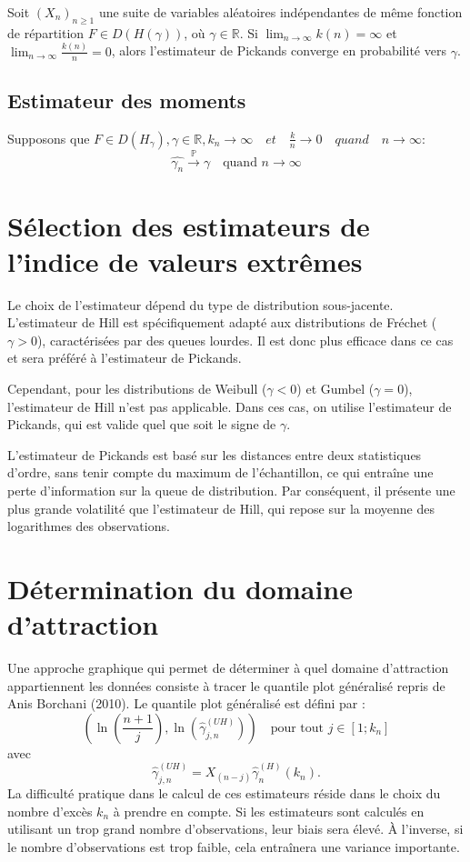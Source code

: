 \documentclass{article}
\begin{document}
Soit \((X_n)_{n \geq 1}\) une suite de variables aléatoires indépendantes de même fonction de répartition \(F \in D(H(\gamma))\), où \(\gamma \in \mathbb{R}\).
Si \(\lim_{n \to \infty} k(n) = \infty\) et \(\lim_{n \to \infty} \frac{k(n)}{n} = 0\), alors l'estimateur de Pickands converge en probabilité vers \(\gamma\).

\subsection{Estimateur des moments}
Supposons que \(F \in D(H_{\gamma}), \gamma \in \mathbb{R}, k_n \to \infty \quad et \quad \frac{k}{n} \to 0 \quad quand \quad n \to \infty\):
\[
\hat{\gamma_n} \xrightarrow{\mathbb{P}} \gamma \quad \text{quand } n \to \infty
\]


\section{Sélection des estimateurs de l'indice de valeurs extrêmes}

Le choix de l’estimateur dépend du type de distribution sous-jacente. L’estimateur de Hill est spécifiquement adapté aux distributions de Fréchet (\(\gamma > 0\)), caractérisées par des queues lourdes. Il est donc plus efficace dans ce cas et sera préféré à l’estimateur de Pickands.  

Cependant, pour les distributions de Weibull (\(\gamma < 0\)) et Gumbel (\(\gamma = 0\)), l’estimateur de Hill n’est pas applicable. Dans ces cas, on utilise l’estimateur de Pickands, qui est valide quel que soit le signe de \( \gamma \).  

L'estimateur de Pickands est basé sur les distances entre deux statistiques d'ordre, sans tenir compte du maximum de l’échantillon, ce qui entraîne une perte d'information sur la queue de distribution. Par conséquent, il présente une plus grande volatilité que l'estimateur de Hill, qui repose sur la moyenne des logarithmes des observations.

\section{Détermination du domaine d'attraction}
Une approche graphique qui permet de déterminer à quel domaine d'attraction appartiennent les données consiste à tracer le quantile plot généralisé repris de Anis Borchani (2010). Le quantile plot généralisé est défini par :
\[
\left( \ln\left( \frac{n+1}{j} \right), \ln\left( \hat{\gamma}_{j,n}^{(UH)} \right) \right) \quad \text{pour tout } j \in \left[ 1; k_n \right]
\]
avec 
\[
\hat{\gamma}_{j,n}^{(UH)} = X_{(n-j)} \hat{\gamma}_{n}^{(H)}(k_n).
\]
La difficulté pratique dans le calcul de ces estimateurs réside dans le choix du nombre d'excès \(k_n\) à prendre en compte. Si les estimateurs sont calculés en utilisant un trop grand nombre d'observations, leur biais sera élevé. À l'inverse, si le nombre d'observations est trop faible, cela entraînera une variance importante.
\end{document}
